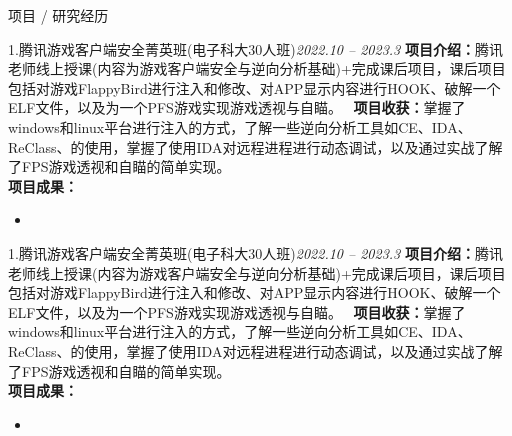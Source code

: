 \documentclass{resume} %
\begin{document}
\begin{rSection}{项目 / 研究经历}
\begin{rSubsection}{1.腾讯游戏客户端安全菁英班(电子科大30人班)}{\em 2022.10 – 2023.3}
{\textbf{项目介绍：}腾讯老师线上授课(内容为游戏客户端安全与逆向分析基础)+完成课后项目，课后项目包括对游戏FlappyBird进行注入和修改、对APP显示内容进行HOOK、破解一个ELF文件，以及为一个PFS游戏实现游戏透视与自瞄。} \
{\textbf{项目收获：}掌握了windows和linux平台进行注入的方式，了解一些逆向分析工具如CE、IDA、ReClass、的使用，掌握了使用IDA对远程进程进行动态调试，以及通过实战了解了FPS游戏透视和自瞄的简单实现。} \\
{\textbf{项目成果：}} 
\item[]
\begin{itemize}
\setlength\itemsep{-0.5em}
\item[] 
\end{itemize}
\end{rSubsection}

\begin{rSubsection}{1.腾讯游戏客户端安全菁英班(电子科大30人班)}{\em 2022.10 – 2023.3}
{\textbf{项目介绍：}腾讯老师线上授课(内容为游戏客户端安全与逆向分析基础)+完成课后项目，课后项目包括对游戏FlappyBird进行注入和修改、对APP显示内容进行HOOK、破解一个ELF文件，以及为一个PFS游戏实现游戏透视与自瞄。} \
{\textbf{项目收获：}掌握了windows和linux平台进行注入的方式，了解一些逆向分析工具如CE、IDA、ReClass、的使用，掌握了使用IDA对远程进程进行动态调试，以及通过实战了解了FPS游戏透视和自瞄的简单实现。} \\
{\textbf{项目成果：}} 
\item[]
\begin{itemize}
\setlength\itemsep{-0.5em}
\item[] 
\end{itemize}
\end{rSubsection}





\end{rSection}
\end{document}
